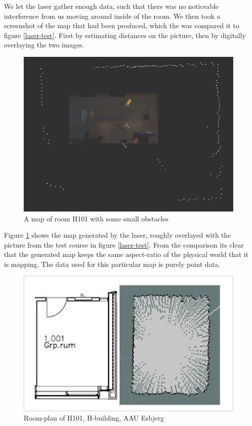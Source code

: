 We let the laser gather enough data, such that there was no noticeable interference from us moving around inside of the room. We then took a screenshot of the map that had been produced, which the was compared it to figure \ref{laser-test}. First by estimating distances on the picture, then by digitally overlaying the two images.

\begin{figure}[H]
	\centering
	\includegraphics[scale=.4]{images/h101_obstacles_overlay.png}
	\caption{A map of room H101 with some small obstacles}
	\label{laser-compare}
\end{figure}
	
Figure \ref{laser-compare} shows the map generated by the laser, roughly overlayed with the picture from the test course in figure \ref{laser-test}. From the comparison its clear that the generated map keeps the same aspect-ratio of the physical world that it is mapping. The data used for this particular map is purely point data.

\begin{figure}[H]
	\centering
	\includegraphics[width=.5\linewidth]{images/compare.jpg}
	\caption{Room-plan of H101, H-building, AAU Esbjerg}
	\label{h101hector}
\end{figure}

